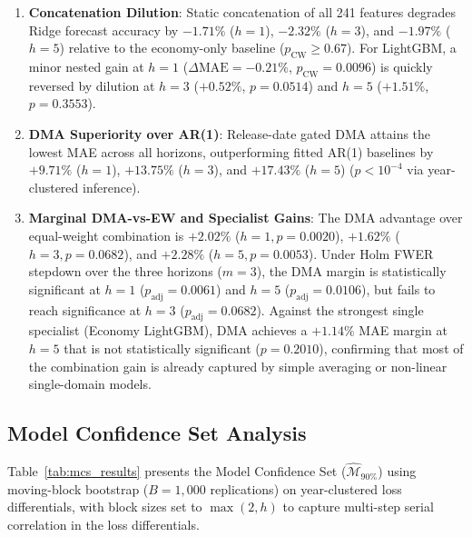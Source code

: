 \documentclass[11pt,a4paper]{article}
\begin{document}
\begin{enumerate}[leftmargin=*, label=\arabic*.]
    \item \textbf{Concatenation Dilution}: Static concatenation of all 241 features degrades Ridge forecast accuracy by $-1.71\%$ ($h{=}1$), $-2.32\%$ ($h{=}3$), and $-1.97\%$ ($h{=}5$) relative to the economy-only baseline ($p_{\text{CW}} \ge 0.67$). For LightGBM, a minor nested gain at $h=1$ ($\Delta\text{MAE} = -0.21\%$, $p_{\text{CW}} = 0.0096$) is quickly reversed by dilution at $h=3$ ($+0.52\%$, $p = 0.0514$) and $h=5$ ($+1.51\%$, $p = 0.3553$).
    \item \textbf{DMA Superiority over AR(1)}: Release-date gated DMA attains the lowest MAE across all horizons, outperforming fitted AR(1) baselines by $+9.71\%$ ($h{=}1$), $+13.75\%$ ($h{=}3$), and $+17.43\%$ ($h{=}5$) ($p < 10^{-4}$ via year-clustered inference).
    \item \textbf{Marginal DMA-vs-EW and Specialist Gains}: The DMA advantage over equal-weight combination is $+2.02\%$ ($h{=}1, p = 0.0020$), $+1.62\%$ ($h{=}3, p = 0.0682$), and $+2.28\%$ ($h{=}5, p = 0.0053$). Under Holm FWER stepdown over the three horizons ($m=3$), the DMA margin is statistically significant at $h=1$ ($p_{\text{adj}} = 0.0061$) and $h=5$ ($p_{\text{adj}} = 0.0106$), but fails to reach significance at $h=3$ ($p_{\text{adj}} = 0.0682$). Against the strongest single specialist (Economy LightGBM), DMA achieves a $+1.14\%$ MAE margin at $h=5$ that is not statistically significant ($p = 0.2010$), confirming that most of the combination gain is already captured by simple averaging or non-linear single-domain models.
\end{enumerate}

\subsection{Model Confidence Set Analysis}

Table~\ref{tab:mcs_results} presents the \citet{hansen2011} Model Confidence Set ($\widehat{\mathcal{M}}_{90\%}$) using moving-block bootstrap ($B=1{,}000$ replications) on year-clustered loss differentials, with block sizes set to $\max(2, h)$ to capture multi-step serial correlation in the loss differentials.
\end{document}
